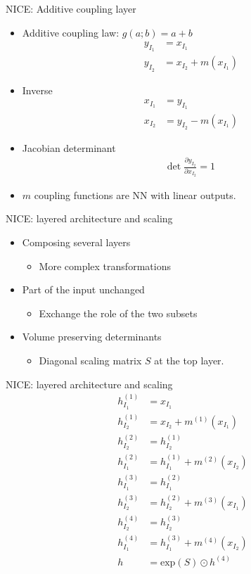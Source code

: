 \begin{frame}{NICE: Additive coupling layer}
\begin{itemize}
    \item Additive coupling law: $g(a; b) = a + b$
    \begin{align*}
                y_{I_1} &= x_{I_1} \\
                y_{I_2} &= x_{I_2} + m(x_{I_1})
    \end{align*}
    \item Inverse
    \begin{align*}
                x_{I_1} &= y_{I_1} \\
                x_{I_2} &= y_{I_2} - m(x_{I_1})
    \end{align*}
    \item Jacobian determinant
    \begin{align*}
        \text{det} \; \frac{\partial y_{I_2}}{\partial x_{I_2}} = 1
    \end{align*}
    \item $m$ coupling functions are NN with linear outputs.
\end{itemize}
\end{frame}
\begin{frame}{NICE: layered architecture and scaling}
    \begin{itemize}
        \item Composing several layers
        \begin{itemize}
            \item More complex transformations
        \end{itemize}
        \item Part of the input unchanged
        \begin{itemize}
            \item Exchange the role of the two subsets
        \end{itemize}
        \item Volume preserving determinants
        \begin{itemize}
            \item Diagonal scaling matrix $S$ at the top layer.
        \end{itemize}
    \end{itemize}
\end{frame}
\begin{frame}{NICE: layered architecture and scaling}
\begin{align*}
    h_{I_1}^{(1)} &= x_{I_1}\\
    h_{I_2}^{(1)} &= x_{I_2} + m^{(1)}(x_{I_1})\\ 
    h_{I_2}^{(2)} &= h_{I_2}^{(1)}\\
    h_{I_1}^{(2)} &= h_{I_1}^{(1)} + m^{(2)}(x_{I_2})\\ 
    h_{I_1}^{(3)} &= h_{I_1}^{(2)}\\
    h_{I_2}^{(3)} &= h_{I_2}^{(2)} + m^{(3)}(x_{I_1})\\ 
    h_{I_2}^{(4)} &= h_{I_2}^{(3)}\\
    h_{I_1}^{(4)} &= h_{I_1}^{(3)} + m^{(4)}(x_{I_2})\\ 
    h &= \text{exp}(S) \odot h^{(4)}
\end{align*}
\end{frame}
